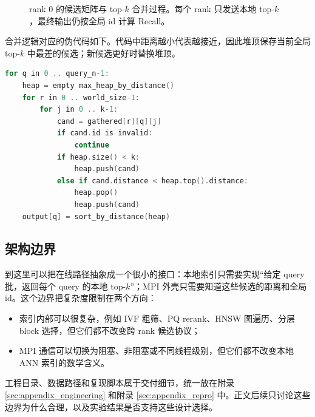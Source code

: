 \documentclass[a4paper,11pt,UTF8]{ctexart}
\newcommand{\code}[1]{\texttt{\detokenize{#1}}}
\begin{document}
\begin{figure}[H]
{
  }
  \caption{rank 0 的候选矩阵与 top-$k$ 合并过程。每个 rank 只发送本地 top-$k$，最终输出仍按全局 id 计算 Recall。}
  \label{fig:candidate_merge}
\end{figure}

合并逻辑对应的伪代码如下。代码中距离越小代表越接近，因此堆顶保存当前全局 top-$k$ 中最差的候选；新候选更好时替换堆顶。

\begin{lstlisting}[language=C++]
for q in 0 .. query_n-1:
    heap = empty max_heap_by_distance()
    for r in 0 .. world_size-1:
        for j in 0 .. k-1:
            cand = gathered[r][q][j]
            if cand.id is invalid:
                continue
            if heap.size() < k:
                heap.push(cand)
            else if cand.distance < heap.top().distance:
                heap.pop()
                heap.push(cand)
    output[q] = sort_by_distance(heap)
\end{lstlisting}

\subsection{架构边界}

到这里可以把在线路径抽象成一个很小的接口：本地索引只需要实现“给定 query 批，返回每个 query 的本地 top-$k$”；MPI 外壳只需要知道这些候选的距离和全局 id。这个边界把复杂度限制在两个方向：
\begin{itemize}
  \item 索引内部可以很复杂，例如 IVF 粗筛、PQ rerank、HNSW 图遍历、分层 block 选择，但它们都不改变跨 rank 候选协议；
  \item MPI 通信可以切换为阻塞、非阻塞或不同线程级别，但它们都不改变本地 ANN 索引的数学含义。
\end{itemize}
工程目录、数据路径和复现脚本属于交付细节，统一放在附录 \ref{sec:appendix_engineering} 和附录 \ref{sec:appendix_repro} 中。正文后续只讨论这些边界为什么合理，以及实验结果是否支持这些设计选择。
\end{document}
